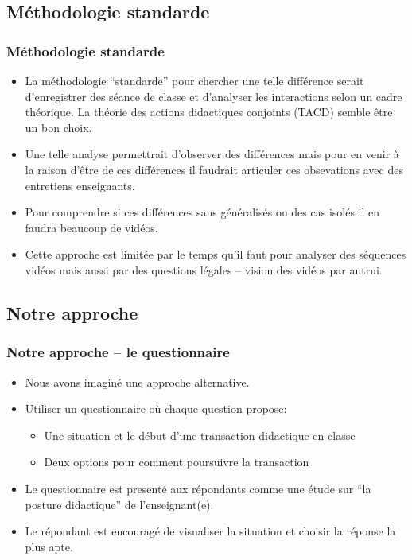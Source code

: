 \documentclass{beamer}
\begin{document}
\subsection{Méthodologie standarde}
\begin{frame}
\frametitle{Méthodologie standarde}
\begin{itemize}
\item La méthodologie ``standarde'' pour chercher une telle différence serait d'enregistrer des séance de classe et d'analyser
les interactions selon un cadre théorique. La théorie des actions didactiques conjoints (TACD) semble être un bon choix.
\item Une telle analyse permettrait d'observer des différences mais pour en venir à la raison d'être de ces différences il faudrait articuler ces obsevations avec des entretiens enseignants.
\item Pour comprendre si ces différences sans généralisés ou des cas isolés il en faudra beaucoup de vidéos.
\item Cette approche est limitée par le temps qu'il faut pour analyser des séquences vidéos mais aussi par des questions
légales -- vision des vidéos par autrui.  
\end{itemize}
\end{frame}

\subsection{Notre approche}
\begin{frame}
\frametitle{Notre approche -- le questionnaire}
\begin{itemize}
\item Nous avons imaginé une approche alternative.
\item Utiliser un questionnaire où chaque question propose:
  \begin{itemize}
   \item Une situation et le début d'une transaction didactique en classe
   \item Deux options pour comment poursuivre la transaction 
  \end{itemize}
\item Le questionnaire est presenté aux répondants comme une étude sur
  ``la posture didactique'' de l'enseignant(e).
\item Le répondant est encouragé de visualiser la situation et choisir la
  réponse la plus apte. 
\end{itemize}
\end{frame}
\end{document}
